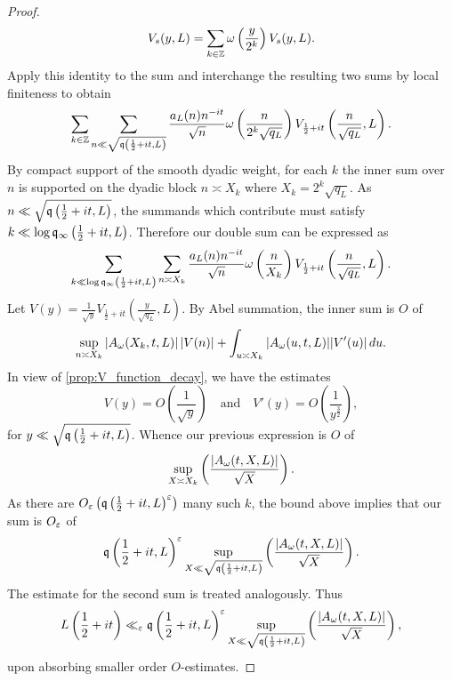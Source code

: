 \begin{proof}
      \[
        V_{s}(y,L) = \sum_{k \in \mathbb{Z}}\omega\left(\frac{y}{2^{k}}\right)V_{s}(y,L).
      \]
      Apply this identity to the sum and interchange the resulting two sums by local finiteness to obtain
      \[
        \sum_{k \in \mathbb{Z}}\sum_{n \ll \sqrt{\mathfrak{q}\left(\frac{1}{2}+it,L\right)}}\frac{a_{L}(n)n^{-it}}{\sqrt{n}}\omega\left(\frac{n}{2^{k}\sqrt{q_{L}}}\right)V_{\frac{1}{2}+it}\left(\frac{n}{\sqrt{q_{L}}},L\right).
      \]
      By compact support of the smooth dyadic weight, for each \(k\) the inner sum over \(n\) is supported on the dyadic block \(n \asymp X_{k}\) where \(X_{k} = 2^{k}\sqrt{q_{L}}\). As \(n \ll \sqrt{\mathfrak{q}\left(\frac{1}{2}+it,L\right)}\), the summands which contribute must satisfy \(k \ll \log\mathfrak{q}_{\infty}\left(\frac{1}{2}+it,L\right)\). Therefore our double sum can be expressed as
      \[
        \sum_{k \ll \log\mathfrak{q}_{\infty}\left(\frac{1}{2}+it,L\right)}\sum_{n \asymp X_{k}}\frac{a_{L}(n)n^{-it}}{\sqrt{n}}\omega\left(\frac{n}{X_{k}}\right)V_{\frac{1}{2}+it}\left(\frac{n}{\sqrt{q_{L}}},L\right).
      \]
      Let \(V(y) = \frac{1}{\sqrt{y}}V_{\frac{1}{2}+it}\left(\frac{y}{\sqrt{q_{L}}},L\right)\). By Abel summation, the inner sum is \(O\) of
      \[
        \sup_{n \asymp X_{k}}|A_{\omega}(X_{k},t,L)|\left|V(n)\right|+\int_{u \asymp X_{k}}|A_{\omega}(u,t,L)||V'(u)|\,du.
      \]
      In view of \cref{prop:V_function_decay}, we have the estimates
      \[
        V(y) = O\left(\frac{1}{\sqrt{y}}\right) \quad \text{and} \quad V'(y) = O\left(\frac{1}{y^{\frac{3}{2}}}\right),
      \]
      for \(y \ll \sqrt{\mathfrak{q}\left(\frac{1}{2}+it,L\right)}\). Whence our previous expression is \(O\) of
      \[
        \sup_{X \asymp X_{k}}\left(\frac{|A_{\omega}(t,X,L)|}{\sqrt{X}}\right).
      \]
      As there are \(O_{\varepsilon}\left(\mathfrak{q}\left(\frac{1}{2}+it,L\right)^{\varepsilon}\right)\) many such \(k\), the bound above implies that our sum is \(O_{\varepsilon}\) of
      \[
        \mathfrak{q}\left(\frac{1}{2}+it,L\right)^{\varepsilon}\sup_{X \ll \sqrt{\mathfrak{q}\left(\frac{1}{2}+it,L\right)}}\left(\frac{|A_{\omega}(t,X,L)|}{\sqrt{X}}\right).
      \]
      The estimate for the second sum is treated analogously. Thus
      \[
        L\left(\frac{1}{2}+it\right) \ll_{\varepsilon} \mathfrak{q}\left(\frac{1}{2}+it,L\right)^{\varepsilon}\sup_{X \ll \sqrt{\mathfrak{q}\left(\frac{1}{2}+it,L\right)}}\left(\frac{|A_{\omega}(t,X,L)|}{\sqrt{X}}\right),
      \]
      upon absorbing smaller order \(O\)-estimates.
    \end{proof}

